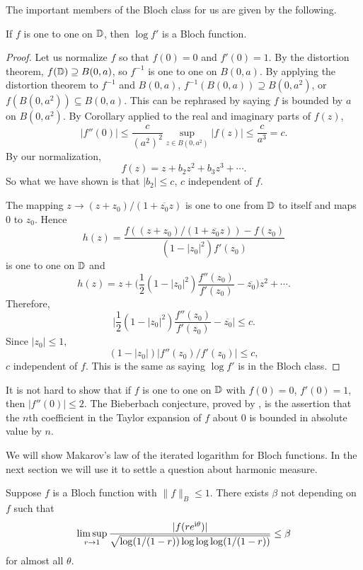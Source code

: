The important members of the Bloch class for us are given by the following.

\begin{proposition}\label{prop:ch5_3.9}
If $f$ is one to one on $\mathbb{D}$, then $\log f'$ is a Bloch function.
\end{proposition}

\begin{proof}
Let us normalize $f$ so that $f(0) = 0$ and $f'(0) = 1$. By the distortion theorem, $f(\mathbb{D}) \supseteq B(0,a)$, so $f^{-1}$ is one to one on $B(0,a)$. By applying the distortion theorem to $f^{-1}$ and $B(0,a)$, $f^{-1}(B(0,a)) \supseteq B(0,a^2)$, or $f(B(0,a^2)) \subseteq B(0,a)$. This can be rephrased by saying $f$ is bounded by $a$ on $B(0,a^2)$. By Corollary  applied to the real and imaginary parts of $f(z)$,
\[
    |f''(0)| \leq \frac{c}{(a^2)^2} \sup_{z\in B(0,a^2)} |f(z)| \leq \frac{c}{a^3} = c.
\]
By our normalization,
\[
    f(z) = z + b_2z^2 + b_3z^3 + \cdots.
\]
So what we have shown is that $|b_2| \leq c$, $c$ independent of $f$.

The mapping $z \to (z + z_0)/(1 + \overline{z_0}z)$ is one to one from $\mathbb{D}$ to itself and maps 0 to $z_0$. Hence
\[
    h(z) = \frac{f((z + z_0)/(1 + \overline{z_0}z)) - f(z_0)}{(1-|z_0|^2)f'(z_0)}
\]
is one to one on $\mathbb{D}$ and
\[
    h(z) = z + \Big(\frac{1}{2}(1-|z_0|^2)\frac{f''(z_0)}{f'(z_0)} - \overline{z_0}\Big)z^2 + \cdots.
\]
Therefore,
\[
    \Big|\frac{1}{2}(1-|z_0|^2)\frac{f''(z_0)}{f'(z_0)} - \overline{z_0}\Big| \leq c.
\]
Since $|z_0| \leq 1$,
\[
    (1-|z_0|)|f''(z_0)/f'(z_0)| \leq c,
\]
$c$ independent of $f$. This is the same as saying $\log f'$ is in the Bloch class.
\end{proof}

It is not hard to show that if $f$ is one to one on $\mathbb{D}$ with $f(0) = 0$, $f'(0) = 1$, then $|f''(0)| \leq 2$. The Bieberbach conjecture, proved by \cite{deBranges1985}, is the assertion that the $n$th coefficient in the Taylor expansion of $f$ about $0$ is bounded in absolute value by $n$.

We will show Makarov's law of the iterated logarithm for Bloch functions. In the next section we will use it to settle a question about harmonic measure.

\begin{theorem}\label{thm:ch5_3.10}
Suppose $f$ is a Bloch function with $\|f\|_B \leq 1$. There exists $\beta$ not depending on $f$ such that
\begin{equation}\label{eq:ch5_3.19}
    \limsup_{r\to 1} \frac{|f(re^{\mathrm{i}   \theta})|}{\sqrt{\log(1/(1-r))\log\log\log(1/(1-r))}} \leq \beta
\end{equation}
\mpagebreak
for almost all $\theta$.
\end{theorem}

